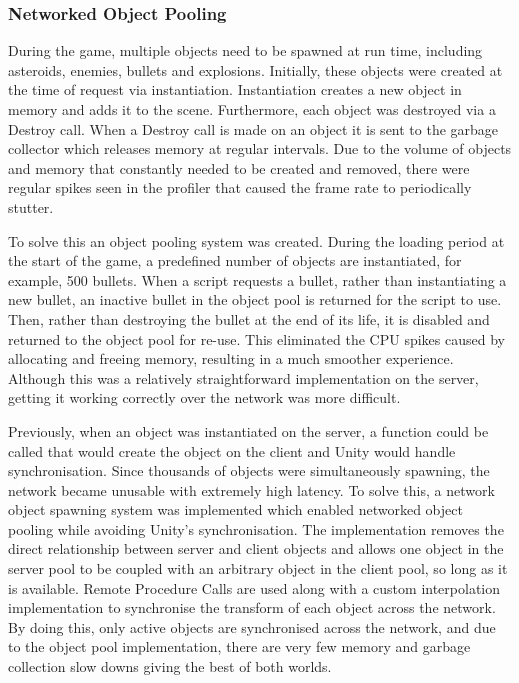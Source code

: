\documentclass[a4paper,11pt]{article}
\begin{document}
\subsubsection{Networked Object Pooling}
During the game, multiple objects need to be spawned at run time, including asteroids, enemies, bullets and explosions. Initially, these objects were created at the time of request via instantiation. Instantiation creates a new object in memory and adds it to the scene. Furthermore, each object was destroyed via a Destroy call. When a Destroy call is made on an object it is sent to the garbage collector which releases memory at regular intervals. Due to the volume of objects and memory that constantly needed to be created and removed, there were regular spikes seen in the profiler that caused the frame rate to periodically stutter.

To solve this an object pooling system was created. During the loading period at the start of the game, a predefined number of objects are instantiated, for example, 500 bullets. When a script requests a bullet, rather than instantiating a new bullet, an inactive bullet in the object pool is returned for the script to use. Then, rather than destroying the bullet at the end of its life, it is disabled and returned to the object pool for re-use. This eliminated the CPU spikes caused by allocating and freeing memory, resulting in a much smoother experience. Although this was a relatively straightforward implementation on the server, getting it working correctly over the network was more difficult. 

Previously, when an object was instantiated on the server, a function could be called that would create the object on the client and Unity would handle synchronisation. Since thousands of objects were simultaneously spawning, the network became unusable with extremely high latency. To solve this, a network object spawning system was implemented which enabled networked object pooling while avoiding Unity’s synchronisation. The implementation removes the direct relationship between server and client objects and allows one object in the server pool to be coupled with an arbitrary object in the client pool, so long as it is available. Remote Procedure Calls are used along with a custom interpolation implementation to synchronise the transform of each object across the network. By doing this, only active objects are synchronised across the network, and due to the object pool implementation, there are very few memory and garbage collection slow downs giving the best of both worlds.
\end{document}
